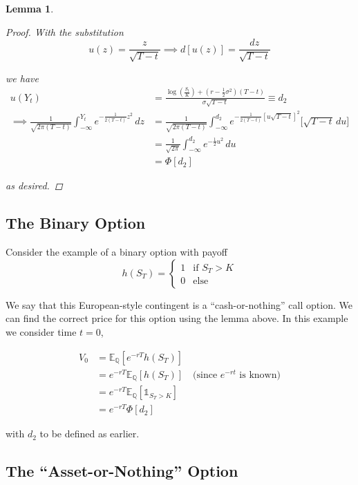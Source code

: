 \documentclass[12pt]{article}
\newtheorem{lemma}{Lemma}
\newlength\tindent
\renewcommand{\indent}{\hspace*{\tindent}}
\begin{document}
\begin{lemma}
\begin{proof}
With the substitution
\begin{equation*}
	u(z) = \frac{z}{\sqrt{T - t}} \implies d[u(z)] = \frac{dz}{\sqrt{T - t}}
\end{equation*}

we have
\begin{align*}
	u(Y_t) &= \frac{\log(\frac{S_t}{K}) + (r - \frac{1}{2}\sigma^2)(T - t)}{\sigma\sqrt{T - t}} \equiv d_2\\
	\implies \frac{1}{\sqrt{2\pi(T-t)}} \int^{Y_t}_{-\infty} e^{-\frac{1}{2(T - t)}z^2}\,dz &=
	\frac{1}{\sqrt{2\pi(T-t)}} \int^{d_2}_{-\infty} e^{-\frac{1}{2(T - t)}[u\sqrt{T - t}]^2}\big[\sqrt{T - t}\,du\big] \\
	&= 	\frac{1}{\sqrt{2\pi}} \int^{d_2}_{-\infty} e^{-\frac{1}{2}u^2}\,du \\
	&= \Phi[d_2]
\end{align*}

as desired.
\end{proof}
\end{lemma}

\subsection{The Binary Option}

Consider the example of a binary option with payoff
\begin{equation*}
	h(S_T) =
	\begin{cases}
		1 & \text{if } S_T > K \\
		0 & \text{else}
	\end{cases}
\end{equation*}

\indent We say that this European-style contingent is a ``cash-or-nothing'' call option. We can find the correct price for this option using the lemma above. In this example we consider time $t = 0$,

\begin{align*}
	V_0 &= \mathbb E_{\mathbb Q}[e^{-rT}h(S_T)] \\
		&= e^{-rT}\mathbb E_{\mathbb Q}[h(S_T)] \quad \text{(since $e^{-rt}$ is known)} \\
		&= e^{-rT}\mathbb E_{\mathbb Q}[\mathds 1_{S_T > K}] \\
		&= e^{-rT}\Phi[d_2]
\end{align*}

with $d_2$ to be defined as earlier.

\subsection{The ``Asset-or-Nothing'' Option}
\end{document}
